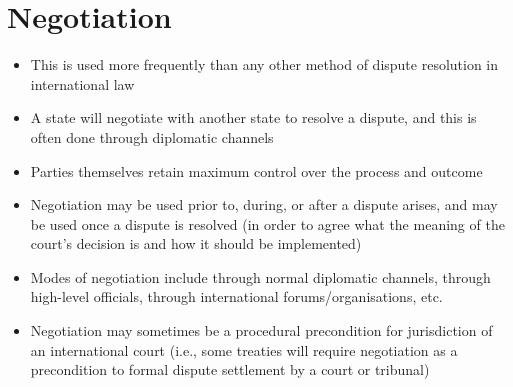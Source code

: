 \section{Negotiation}
\begin{itemize}
    \item This is used more frequently than any other method of dispute resolution in international law
    \item A state will negotiate with another state to resolve a dispute, and this is often done through diplomatic channels
    \item Parties themselves retain maximum control over the process and outcome
    \item Negotiation may be used prior to, during, or after a dispute arises, and may be used once a dispute is resolved (in order to agree what the meaning of the court's decision is and how it should be implemented)
    \item Modes of negotiation include through normal diplomatic channels, through high-level officials, through international forums/organisations, etc.
    \item Negotiation may sometimes be a procedural precondition for jurisdiction of an international court (i.e., some treaties will require negotiation as a precondition to formal dispute settlement by a court or tribunal)
\end{itemize}

